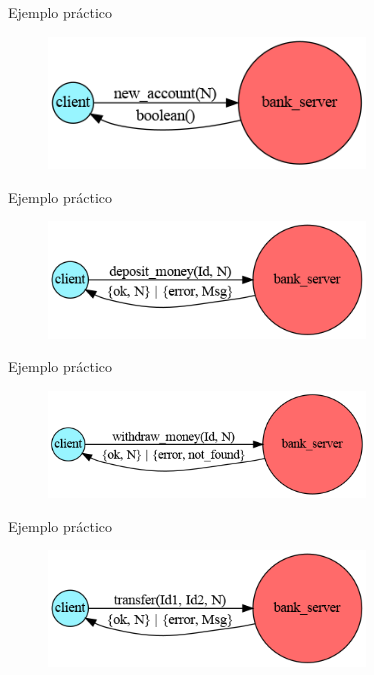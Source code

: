 \documentclass{beamer}
\begin{document}
    \begin{frame}{Ejemplo práctico}
      \begin{figure}
        \includegraphics[width=0.75\textwidth]{2_new_account.dot.png}
      \end{figure}
    \end{frame}

    \begin{frame}{Ejemplo práctico}
      \begin{figure}
        \includegraphics[width=0.75\textwidth]{3_deposit_money.dot.png}
      \end{figure}
    \end{frame}

    \begin{frame}{Ejemplo práctico}
      \begin{figure}
        \includegraphics[width=0.75\textwidth]{4_withdraw_money.dot.png}
      \end{figure}
    \end{frame}

    \begin{frame}{Ejemplo práctico}
      \begin{figure}
        \includegraphics[width=0.75\textwidth]{5_transfer.dot.png}
      \end{figure}
    \end{frame}
\end{document}
